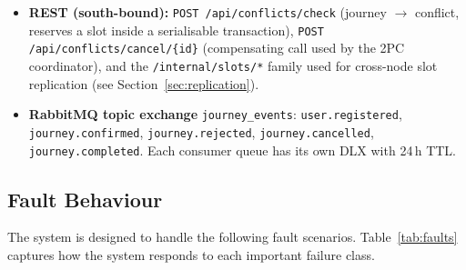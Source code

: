 \documentclass[12pt,a4paper]{article}
\begin{document}
\begin{itemize}
  \item \textbf{REST (south-bound):} \texttt{POST /api/conflicts/check}
        (journey $\to$ conflict, reserves a slot inside a serialisable
        transaction), \texttt{POST /api/conflicts/cancel/\{id\}}
        (compensating call used by the 2PC coordinator), and the
        \texttt{/internal/slots/*} family used for cross-node slot
        replication (see Section~\ref{sec:replication}).
  \item \textbf{RabbitMQ topic exchange} \texttt{journey\_events}:
        \texttt{user.registered}, \texttt{journey.confirmed},
        \texttt{journey.rejected}, \texttt{journey.cancelled},
        \texttt{journey.completed}. Each consumer queue has its own DLX
        with 24\,h TTL.
\end{itemize}

\subsection{Fault Behaviour}
 
The system is designed to handle the following fault scenarios. Table~\ref{tab:faults} captures how the system responds to each important failure class.
\end{document}
